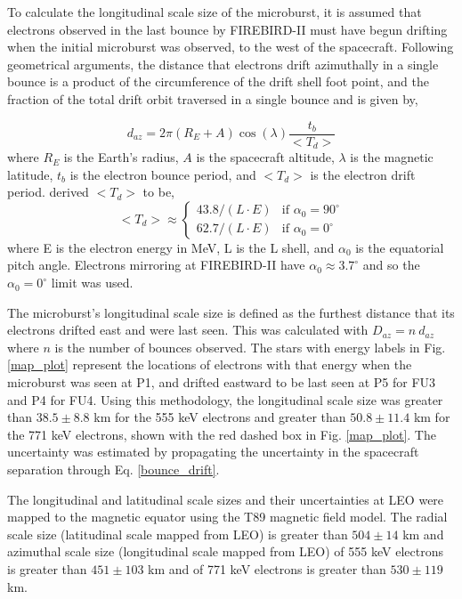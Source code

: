 \documentclass[draft, linenumbers]{agujournal}
\begin{document}
To calculate the longitudinal scale size of the microburst, it is assumed that electrons observed in the last bounce by FIREBIRD-II must have begun drifting when the initial microburst was observed, to the west of the spacecraft. Following geometrical arguments, the distance that electrons drift azimuthally in a single bounce is a product of the circumference of the drift shell foot point, and the fraction of the total drift orbit traversed in a single bounce and is given by, 

\begin{equation}
d_{az} = 2 \pi (R_E + A) \cos(\lambda) \frac{t_b}{<T_{d}>}
\label{bounce_drift}
\end{equation} where $R_E$ is the Earth's radius, $A$ is the spacecraft altitude, $\lambda$ is the magnetic latitude, $t_b$ is the electron bounce period, and $<T_{d}>$ is the electron drift period. \citet{Parks2003} derived $<T_{d}>$ to be,
\begin{equation}
<T_{d}> \approx
\begin{cases}
43.8 /(L \cdot E) & \text{if } \alpha_0 = 90^{\circ} \\    62.7/(L \cdot E) & \text{if } \alpha_0 = 0^{\circ}
\end{cases}
\label{drift}
\end{equation} where E is the electron energy in MeV, L is the L shell, and $\alpha_0$ is the equatorial pitch angle. Electrons mirroring at FIREBIRD-II have $\alpha_0 {\approx} 3.7^{\circ}$ and so the $\alpha_0 = 0^{\circ}$ limit was used.

The microburst's longitudinal scale size is defined as the furthest distance that its electrons drifted east and were last seen. This was calculated with $D_{az} = n \ d_{az}$ where $n$ is the number of bounces observed. The stars with energy labels in Fig. \ref{map_plot} represent the locations of electrons with that energy when the microburst was seen at P1, and drifted eastward to be last seen at P5 for FU3 and P4 for FU4. Using this methodology, the longitudinal scale size was greater than $ 38.5 \pm 8.8$ km for the 555 keV electrons and greater than $ 50.8 \pm 11.4$ km for the 771 keV electrons, shown with the red dashed box in Fig. \ref{map_plot}. The uncertainty was estimated by propagating the uncertainty in the spacecraft separation through Eq. \ref{bounce_drift}.

The longitudinal and latitudinal scale sizes and their uncertainties at LEO were mapped to the magnetic equator using the T89 magnetic field model. The radial scale size (latitudinal scale mapped from LEO) is greater than $504 \pm​ 14$ km and azimuthal scale size (longitudinal scale mapped from LEO) of 555 keV electrons is greater than $451 \pm 103$ km and of 771 keV electrons is greater than $530 \pm 119$ km.
\end{document}

